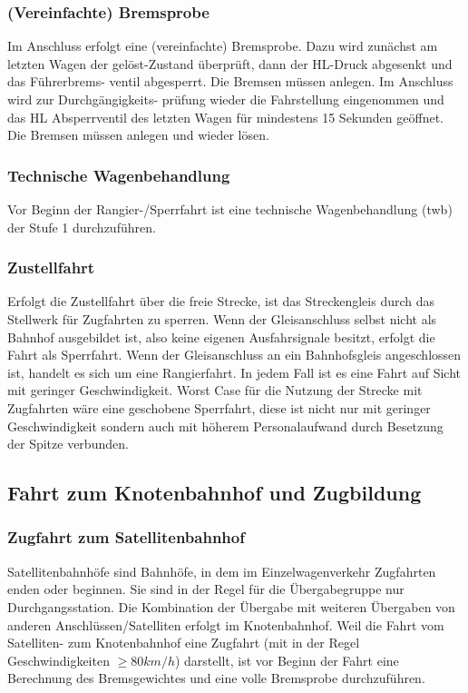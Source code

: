 \subsubsection{(Vereinfachte) Bremsprobe}\label{sec:vBremsprobe}
Im Anschluss erfolgt eine (vereinfachte) \gls{Bremsprobe}. Dazu wird zunächst am letzten Wagen der gelöst-Zustand überprüft, dann der \acrshort{HL}-Druck abgesenkt und das Führerbrems- ventil abgesperrt. Die Bremsen müssen anlegen. Im Anschluss wird zur Durchgängigkeits- prüfung wieder die Fahrstellung eingenommen und das \acrshort{HL} Absperrventil des letzten Wagen für mindestens 15 Sekunden geöffnet. Die Bremsen müssen anlegen und wieder lösen.
\subsubsection{Technische Wagenbehandlung}\label{sec:tWb}
Vor Beginn der Rangier-/\gls{Sperrfahrt} ist eine technische Wagenbehandlung (\acrshort{twb}) der Stufe 1 %
durchzuführen. 
\subsubsection{Zustellfahrt}\label{sec:Zustellfahrt}
Erfolgt die Zustellfahrt über die freie Strecke, ist das Streckengleis durch das Stellwerk für \gls{Zugfahrt}en zu sperren. Wenn der Gleisanschluss selbst nicht als Bahnhof ausgebildet ist, also keine eigenen Ausfahrsignale besitzt, erfolgt die Fahrt als \gls{Sperrfahrt}. Wenn der \gls{Gleisanschluss} an ein Bahnhofsgleis angeschlossen ist, handelt es sich um eine \gls{Rangierfahrt}. In jedem Fall ist es eine Fahrt auf Sicht mit geringer Geschwindigkeit. Worst Case für die Nutzung der Strecke mit \gls{Zugfahrt}en wäre eine geschobene \gls{Sperrfahrt}, diese ist nicht nur mit geringer Geschwindigkeit sondern auch mit höherem Personalaufwand durch Besetzung der Spitze verbunden.

\subsection{Fahrt zum Knotenbahnhof und Zugbildung}
\subsubsection{Zugfahrt zum Satellitenbahnhof}\label{sec:Zugfahrt}
Satellitenbahnhöfe sind Bahnhöfe, in dem im Einzelwagenverkehr \gls{Zugfahrt}en enden oder beginnen. Sie sind in der Regel für die Übergabegruppe nur Durchgangsstation. Die Kombination der Übergabe mit weiteren Übergaben von anderen Anschlüssen/Satelliten erfolgt im \gls{Knotenbahnhof}. Weil die Fahrt vom Satelliten- zum \gls{Knotenbahnhof} eine \gls{Zugfahrt} (mit in der Regel Geschwindigkeiten $\ge 80 km/h$) darstellt, ist vor Beginn der Fahrt eine Berechnung des Bremsgewichtes und eine volle \gls{Bremsprobe} durchzuführen.%
